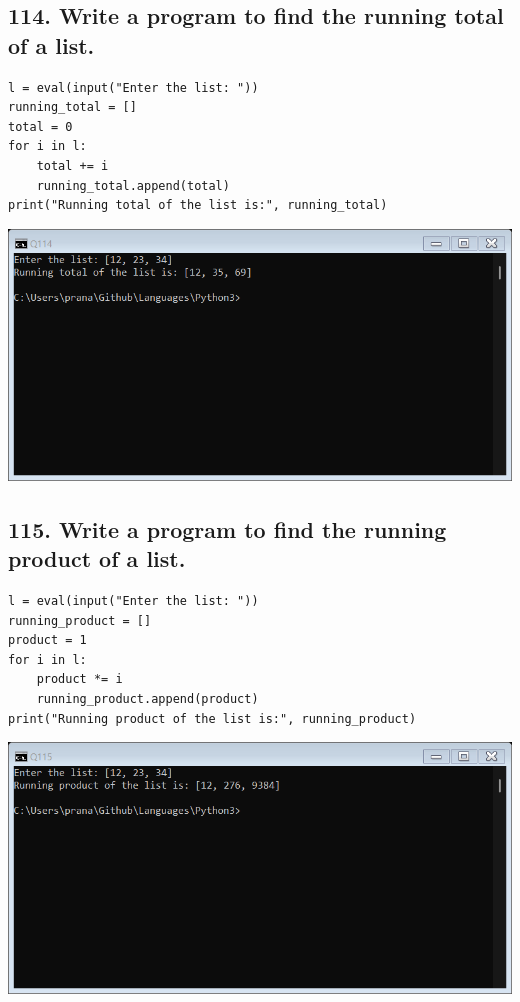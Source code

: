 \documentclass[12pt]{article}
\begin{document}
\subsection*{114. Write a program to find the running total of a list.}
\begin{verbatim}
l = eval(input("Enter the list: "))
running_total = []
total = 0
for i in l:
    total += i
    running_total.append(total)
print("Running total of the list is:", running_total)
\end{verbatim}
\includegraphics[width=\linewidth]{images/114.png}

\subsection*{115. Write a program to find the running product of a list.}
\begin{verbatim}
l = eval(input("Enter the list: "))
running_product = []
product = 1
for i in l:
    product *= i
    running_product.append(product)
print("Running product of the list is:", running_product)
\end{verbatim}
\includegraphics[width=\linewidth]{images/115.png}
\end{document}
